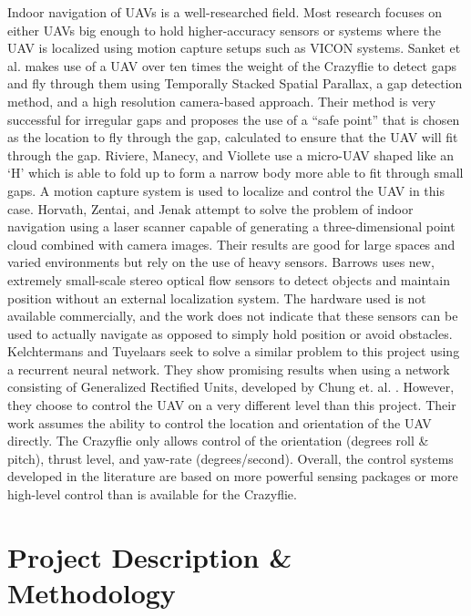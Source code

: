 \documentclass[12pt]{article}
\begin{document}
Indoor navigation of UAVs is a well-researched field. Most research focuses on either UAVs big enough to hold higher-accuracy sensors or systems where the UAV is localized using motion capture setups such as VICON systems. Sanket et al. \cite{gapflyt} makes use of a UAV over ten times the weight of the Crazyflie to detect gaps and fly through them using Temporally Stacked Spatial Parallax, a gap detection method, and a high resolution camera-based approach. Their method is very successful for irregular gaps and proposes the use of a ``safe point'' that is chosen as the location to fly through the gap, calculated to ensure that the UAV will fit through the gap. Riviere, Manecy, and Viollete\cite{Folding} use a micro-UAV shaped like an `H' which is able to fold up to form a narrow body more able to fit through small gaps. A motion capture system is used to localize and control the UAV in this case. Horvath, Zentai, and Jenak\cite{PCNav} attempt to solve the problem of indoor navigation using a laser scanner capable of generating a three-dimensional point cloud combined with camera images. Their results are good for large spaces and varied environments but rely on the use of heavy sensors. Barrows\cite{crazyflie_centeye} uses new, extremely small-scale stereo optical flow sensors to detect objects and maintain position without an external localization system. The hardware used is not available commercially, and the work does not indicate that these sensors can be used to actually navigate as opposed to simply hold position or avoid obstacles. Kelchtermans and Tuyelaars \cite{RNNTraining} seek to solve a similar problem to this project using a recurrent neural network. They show promising results when using a network consisting of Generalized Rectified Units, developed by Chung et. al. \cite{GRU}. However, they choose to control the UAV on a very different level than this project. Their work assumes the ability to control the location and orientation of the UAV directly. The Crazyflie only allows control of the orientation (degrees roll \& pitch), thrust level, and yaw-rate (degrees/second). Overall, the control systems developed in the literature are based on more powerful sensing packages or more high-level control than is available for the Crazyflie.

\section{Project Description \& Methodology}
\end{document}
